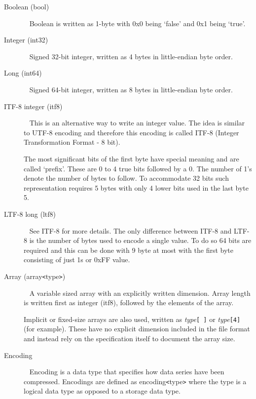 \documentclass[a4paper]{article}
\begin{document}
\begin{description}

\item[Boolean (bool)]\ \newline
Boolean is written as 1-byte with 0x0 being `false' and 0x1 being `true'.

\item[Integer (int32)]\ \newline
Signed 32-bit integer, written as 4 bytes in little-endian byte order.

\item[Long (int64)]\ \newline
Signed 64-bit integer, written as 8 bytes in little-endian byte order.

\item[ITF-8 integer (itf8)]\ \newline
This is an alternative way to write an integer value. The idea is similar to UTF-8 
encoding and therefore this encoding is called ITF-8 (Integer Transformation Format 
- 8 bit). 

The most significant bits of the first byte have special meaning and are called 
`prefix'. These are 0 to 4 true bits followed by a 0. The number of 1's denote 
the number of bytes to follow. To accommodate 32 bits such representation requires 
5 bytes with only 4 lower bits used in the last byte 5.

\item[LTF-8 long (ltf8)]\ \newline
See ITF-8 for more details. The only difference between ITF-8 and LTF-8 is the 
number of bytes used to encode a single value. To do so 64 bits are required and 
this can be done with 9 byte at most with the first byte consisting of just 1s 
or 0xFF value. 

\item[{Array (array\texttt{<}type\texttt{>})}]\ \newline
A variable sized array with an explicitly written dimension.
Array length is written first as integer (itf8), followed by the elements of the array.

Implicit or fixed-size arrays are also used, written as \textit{type}\texttt{[ ]} or \textit{type}\texttt{[4]} (for example).
These have no explicit dimension included in the file format and instead rely on the specification itself to document the array size.


\item[{Encoding}]\ \newline
Encoding is a data type that specifies how data series have been compressed. Encodings 
are defined as encoding\texttt{<}type\texttt{>} where the type is a logical data 
type as opposed to a storage data type.


\end{description}
\end{document}

